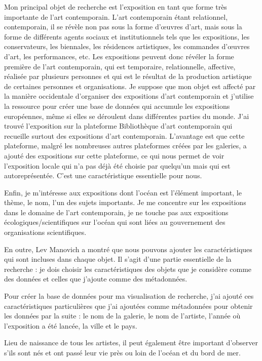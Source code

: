 \documentclass[a4paper, twoside, 12pt]{book}
\begin{document}
Mon principal objet de recherche est l'exposition en tant que forme très importante de l'art contemporain. L'art contemporain étant relationnel, contemporain, il se révèle non pas sous la forme d'œuvres d'art, mais sous la forme de différents agents sociaux et institutionnels tels que les expositions, les conservateurs, les biennales, les résidences artistiques, les commandes d'œuvres d'art, les performances, etc.  Les expositions peuvent donc révéler la forme première de l'art contemporain, qui est temporaire, relationnelle, affective, réalisée par plusieurs personnes et qui est le résultat de la production artistique de certaines personnes et organisations. Je suppose que mon objet est affecté par la manière occidentale d'organiser des expositions d'art contemporain et j'utilise la ressource pour créer une base de données qui accumule les expositions européennes, même si elles se déroulent dans différentes parties du monde. J'ai trouvé l'exposition sur la plateforme Bibliothèque d'art contemporain qui recueille surtout des expositions d'art contemporain. L'avantage est que cette plateforme, malgré les nombreuses autres plateformes créées par les galeries, a ajouté des expositions sur cette plateforme, ce qui nous permet de voir l'exposition locale qui n'a pas déjà été choisie par quelqu'un mais qui est autoreprésentée. C'est une caractéristique essentielle pour nous. 

Enfin, je m'intéresse aux expositions dont l'océan est l'élément important, le thème, le nom, l'un des sujets importants. Je me concentre sur les expositions dans le domaine de l'art contemporain, je ne touche pas aux expositions écologiques/scientifiques sur l'océan qui sont liées au gouvernement des organisations scientifiques. 

En outre, Lev Manovich a montré que nous pouvons ajouter les caractéristiques qui sont incluses dans chaque objet.  Il s'agit d'une partie essentielle de la recherche : je dois choisir les caractéristiques des objets que je considère comme des données et celles que j'ajoute comme des métadonnées.

Pour créer la base de données pour ma visualisation de recherche, j'ai ajouté ces caractéristiques particulières que j'ai ajoutées comme métadonnées pour obtenir les données par la suite : le nom de la galerie, le nom de l'artiste, l'année où l'exposition a été lancée, la ville et le pays.

Lieu de naissance de tous les artistes, il peut également être important d'observer s'ils sont nés et ont passé leur vie près ou loin de l'océan et du bord de mer.
\end{document}
